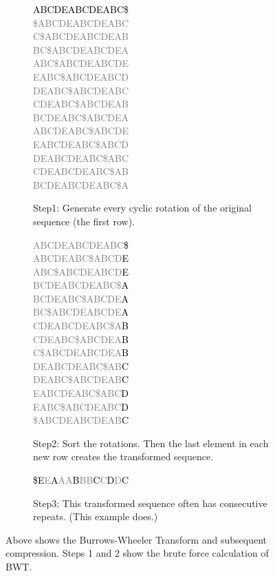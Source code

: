 \begin{figure}
\center
\begin{subfigure}{.3\linewidth}
\footnotesize
\textcolor{gray}{
\textcolor{black}{ABCDEABCDEABC\$}\\
\$ABCDEABCDEABC\\
C\$ABCDEABCDEAB\\
BC\$ABCDEABCDEA\\
ABC\$ABCDEABCDE\\
EABC\$ABCDEABCD\\
DEABC\$ABCDEABC\\
CDEABC\$ABCDEAB\\
BCDEABC\$ABCDEA\\
ABCDEABC\$ABCDE\\
EABCDEABC\$ABCD\\
DEABCDEABC\$ABC\\
CDEABCDEABC\$AB\\
BCDEABCDEABC\$A\\
}
\caption{Step1: Generate every cyclic rotation of the original sequence (the first row).}
\label{fig:bwtStep1}
\end{subfigure}
\begin{subfigure}{.3\linewidth}
\footnotesize
\textcolor{gray}{
ABCDEABCDEABC\textcolor{black}{\$}\\
ABCDEABC\$ABCD\textcolor{black}{E}\\
ABC\$ABCDEABCD\textcolor{black}{E}\\
BCDEABCDEABC\$\textcolor{black}{A}\\
BCDEABC\$ABCDE\textcolor{black}{A}\\
BC\$ABCDEABCDE\textcolor{black}{A}\\
CDEABCDEABC\$A\textcolor{black}{B}\\
CDEABC\$ABCDEA\textcolor{black}{B}\\
C\$ABCDEABCDEA\textcolor{black}{B}\\
DEABCDEABC\$AB\textcolor{black}{C}\\
DEABC\$ABCDEAB\textcolor{black}{C}\\
EABCDEABC\$ABC\textcolor{black}{D}\\
EABC\$ABCDEABC\textcolor{black}{D}\\
\$ABCDEABCDEAB\textcolor{black}{C}\\
}
\caption{Step2: Sort the rotations. Then the last element in each new row creates the transformed sequence.}
\label{fig:bwtStep2}
\end{subfigure}
\begin{subfigure}{.3\linewidth}
\footnotesize
\textcolor{gray}{\textcolor{black}{\$E}E\textcolor{black}{A}AA\textcolor{black}{B}BB\textcolor{black}{C}C\textcolor{black}{D}D\textcolor{black}{C}}\\
\caption{Step3: This transformed sequence often has consecutive repeats. (This example does.)}
\label{fig:bwtStep3}
\end{subfigure}
\caption[Burrows Wheeler Transform]{Above shows the Burrows-Wheeler Transform and subsequent compression. Steps 1 and 2 show the brute force calculation of BWT.}
\label{fig:bwt}
\end{figure}
